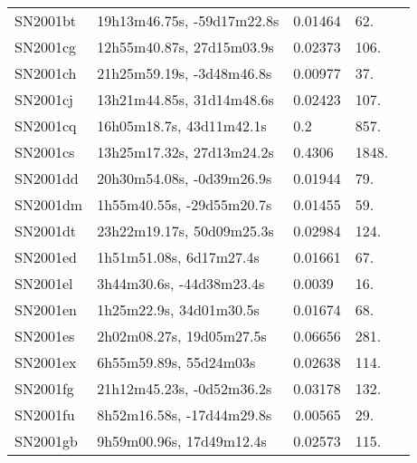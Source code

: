 \begin{longtable}{lllll}
         SN2001bt &     19h13m46.75s, -59d17m22.8s &  0.01464 &            62. &    \citet{1992ApJS...81..413M} \\
         SN2001cg &      12h55m40.87s, 27d15m03.9s &  0.02373 &           106. &    \citet{1999PASP..111..438F} \\
         SN2001ch &      21h25m59.19s, -3d48m46.8s &  0.00977 &            37. &  \citet{2005AandA...435..459H} \\
         SN2001cj &      13h21m44.85s, 31d14m48.6s &  0.02423 &           107. &    \citet{1991RC3.9.C...0000d} \\
         SN2001cq &       16h05m18.7s, 43d11m42.1s &      0.2 &           857. &    \citet{2001IAUC.7649A...1D} \\
         SN2001cs &      13h25m17.32s, 27d13m24.2s &   0.4306 &          1848. &    \citet{2007ApJ...657..738L} \\
         SN2001dd &      20h30m54.08s, -0d39m26.9s &  0.01944 &            79. &  \citet{2005AandA...435..459H} \\
         SN2001dm &      1h55m40.55s, -29d55m20.7s &  0.01455 &            59. &  \citet{1998AandAS..130..333T} \\
         SN2001dt &      23h22m19.17s, 50d09m25.3s &  0.02984 &           124. &    \citet{1999ApJS..121..287H} \\
         SN2001ed &        1h51m51.08s, 6d17m27.4s &  0.01661 &            67. &    \citet{1985ApJS...58..623G} \\
         SN2001el &       3h44m30.6s, -44d38m23.4s &   0.0039 &            16. &    \citet{2004AJ....128...16K} \\
         SN2001en &        1h25m22.9s, 34d01m30.5s &  0.01674 &            68. &  \citet{2011AandA...533A..19B} \\
         SN2001es &       2h02m08.27s, 19d05m27.5s &  0.06656 &           281. &    \citet{2016SDSSD.C...0000:} \\
         SN2001ex &         6h55m59.89s, 55d24m03s &  0.02638 &           114. &    \citet{2000AJ....120.2338R} \\
         SN2001fg &      21h12m45.23s, -0d52m36.2s &  0.03178 &           132. &    \citet{2011ApJ...735..125S} \\
         SN2001fu &      8h52m16.58s, -17d44m29.8s &  0.00565 &            29. &    \citet{2003AJ....126.2268W} \\
         SN2001gb &       9h59m00.96s, 17d49m12.4s &  0.02573 &           115. &    \citet{1995ApJS..100...69F} \\

\end{longtable}
